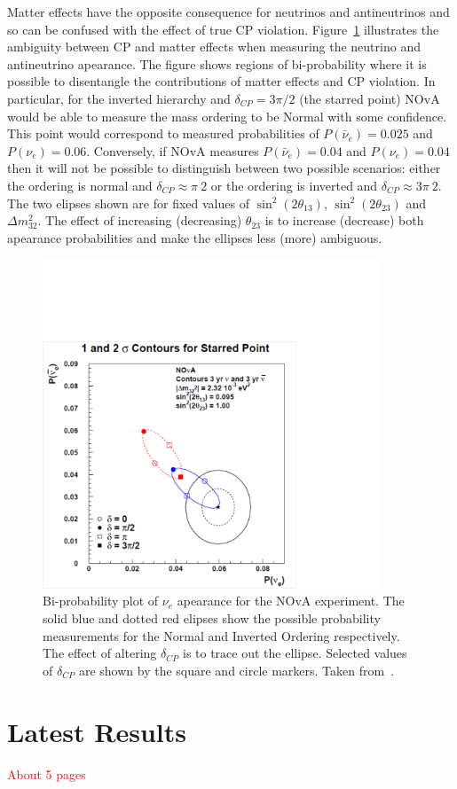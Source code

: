 Matter effects have the opposite consequence for neutrinos and
antineutrinos and so can be confused with the effect of true CP
violation. Figure~\ref{fig:BiProb} illustrates the ambiguity between
CP and matter effects when measuring the neutrino and antineutrino
apearance. 
The figure shows regions of bi-probability where it is possible to
disentangle the contributions of matter effects and CP violation. In
particular, for the inverted hierarchy and $\delta_{CP} = 3\pi /2$
(the starred point) NOvA would be able to measure the mass ordering to 
be Normal with some confidence. This point would correspond to
measured probabilities of $P(\bar{\nu}_e) = 0.025$ and $P(\nu_e) =
0.06$. 
Conversely, if NOvA measures $P(\bar{\nu}_e) = 0.04$ and $P(\nu_e) =
0.04$ then it will not be possible to distinguish between two possible
scenarios: either the ordering is normal and $\delta_{CP} \approx \pi
\ 2$ or the ordering is inverted and $\delta_{CP} \approx 3 \pi
\ 2$.
The two elipses shown are for fixed values of 
$\sin^2\left( 2\theta_{13} \right)$, $\sin^2\left( 2\theta_{23}
\right)$ and $\Delta m_{32}^2$. The effect of increasing (decreasing)
$\theta_{23}$ is to increase (decrease) both apearance probabilities
and make the ellipses less (more) ambiguous.

\begin{figure}
  \centering
  \includegraphics[width=0.9\textwidth]{../../img/Theory/09_Bi-Probability_Plots.pdf}
  \caption{
    Bi-probability plot of $\nu_e$ apearance for the NOvA experiment. 
    The solid blue and dotted red elipses show the possible
    probability measurements for the Normal and Inverted Ordering
    respectively. The effect of altering $\delta_{CP}$ is to trace out the
    ellipse. Selected values of $\delta_{CP}$ are shown by the square
    and circle markers.
    Taken from~\cite{NOvA_plotsAndFigures}.
  } 
  \label{fig:BiProb}
\end{figure}


\section{Latest Results}
\textcolor{red}{About 5 pages}